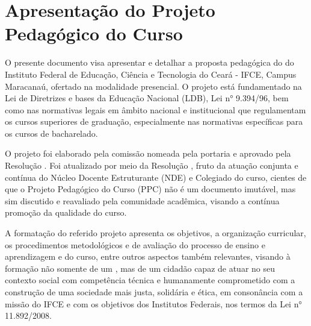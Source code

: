 \clearpage
\section{Apresentação do Projeto Pedagógico do Curso}

O presente documento visa apresentar e detalhar a proposta pedagógica do \NOMECURSO do Instituto Federal de Educação, Ciência e Tecnologia do Ceará - IFCE, Campus Maracanaú, ofertado na modalidade presencial. O projeto está fundamentado na Lei de Diretrizes e bases da Educação Nacional (LDB), Lei n° 9.394/96, bem como nas normativas legais em âmbito nacional e institucional que regulamentam os cursos superiores de graduação, especialmente nas normativas específicas para os cursos de bacharelado. 

O projeto foi elaborado pela comissão nomeada pela portaria \PORTARIACOMISSAO e aprovado pela Resolução \RESOLUCAOAPROVACAO. Foi atualizado por meio da Resolução \RESOLUCAOAPROVACAONOVA, fruto da atuação conjunta e contínua do Núcleo Docente Estruturante (NDE) e Colegiado do curso, cientes de que o Projeto Pedagógico do Curso (PPC) não é um documento imutável, mas sim discutido e reavaliado pela comunidade acadêmica, visando a contínua promoção da qualidade do curso. 

A formatação do referido projeto apresenta os objetivos, a organização curricular, os procedimentos metodológicos e de avaliação do processo de ensino e aprendizagem e do curso, entre outros aspectos também relevantes, visando à formação não somente de um \NOMEPROFISSIONAL, mas de um cidadão capaz de atuar no seu contexto social com competência técnica e humanamente comprometido com a construção de uma sociedade mais justa, solidária e ética, em consonância com a missão do IFCE e com os objetivos dos Institutos Federais, nos termos da Lei n° 11.892/2008.

